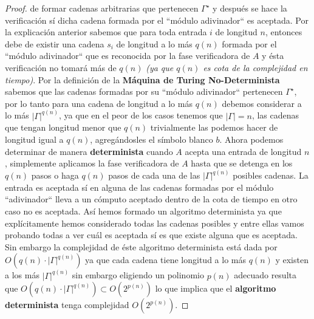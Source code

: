 \documentclass{article}
\begin{document}
\begin{proof}
    de formar cadenas arbitrarias que pertenecen \(\varGamma^{\star}\) y después se hace la verificación sí dicha 
    cadena formada por el ``módulo adivinador`` es aceptada. 
    \newline 
    Por la explicación anterior sabemos que para toda entrada \(i\) de longitud \(n\), entonces debe de existir una
    cadena \(s_{i}\) de longitud a lo más \(q(n)\) formada por el ``módulo adivinador`` que es reconocida por la fase 
    verificadora de \(A\) y ésta verificación no tomará más de \(q(n)\) \textit{(ya que \(q(n)\) es cota de la 
    complejidad en tiempo)}. Por la definición de la \textbf{Máquina de Turing No-Determinista} sabemos que las 
    cadenas formadas por su ``módulo adivinador`` pertenecen \(\varGamma^{\star}\), por lo tanto para una cadena
    de longitud a lo más \(q\left(n\right)\) debemos considerar a lo más \(|\varGamma|^{q\left(n\right)}\), ya que 
    en el peor de los casos tenemos que \(|\varGamma| = n\), las cadenas que tengan longitud menor que \(q\left(n\right)\) 
    trivialmente las podemos hacer de longitud igual a \(q\left(n\right)\), agregándosles el símbolo blanco \(b\). 
    Ahora podemos determinar de manera \textbf{determinista} cuando \(A\) acepta una entrada de longitud \(n\), simplemente 
    aplicamos la fase verificadora de \(A\) hasta que se detenga en los \(q(n)\) pasos 
    o haga \(q(n)\) pasos de cada una de las \(|\varGamma|^{q(n)}\) posibles cadenas. La entrada es aceptada sí en alguna de 
    las cadenas formadas por el módulo ``adivinador`` lleva a un cómputo aceptado dentro de la cota de tiempo en otro caso 
    no es aceptada. Así hemos formado un algoritmo determinista ya que explícitamente hemos considerado todas las cadenas posibles
    y entre ellas vamos probando todas a ver cuál es aceptada sí es que existe alguna que es aceptada. Sin embargo la complejidad 
    de éste algoritmo determinista está dada por \(O\left(q(n) \cdot |\varGamma|^{q(n)}\right)\) ya que cada cadena tiene longitud a lo más 
    \(q(n)\) y existen a los más \(|\varGamma|^{q(n)}\) sin embargo eligiendo un polinomio \(p(n)\) adecuado resulta que
    \(O\left(q(n) \cdot |\varGamma|^{q(n)}\right) \subset O\left(2^{p(n)}\right)\) lo que implica que el 
    \textbf{algoritmo determinista} tenga complejidad \(O\left(2^{p(n)}\right)\).
\end{proof}
\end{document}
